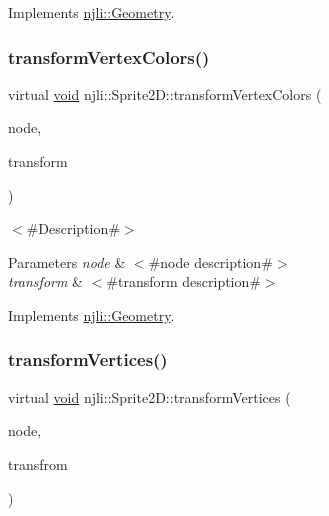 Implements \mbox{\hyperlink{classnjli_1_1_geometry_a8ffb29f40c6f175f83cc36568feb87c4}{njli\+::\+Geometry}}.

\mbox{\label{classnjli_1_1_sprite2_d_a9faa5df865ca871af37dea98682a52a2}} 
\subsubsection{\texorpdfstring{transform\+Vertex\+Colors()}{transformVertexColors()}}
{\footnotesize\ttfamily virtual \mbox{\hyperlink{_thread_8h_af1e856da2e658414cb2456cb6f7ebc66}{void}} njli\+::\+Sprite2\+D\+::transform\+Vertex\+Colors (\begin{DoxyParamCaption}\item[{\mbox{\hyperlink{classnjli_1_1_node}{Node}} $\ast$}]{node,  }\item[{const bt\+Transform \&}]{transform }\end{DoxyParamCaption})\hspace{0.3cm}{\ttfamily [virtual]}}

$<$\#\+Description\#$>$


\begin{DoxyParams}{Parameters}
{\em node} & $<$\#node description\#$>$ \\
\hline
{\em transform} & $<$\#transform description\#$>$ \\
\hline
\end{DoxyParams}


Implements \mbox{\hyperlink{classnjli_1_1_geometry_a1169257a4241392cec0a23c922f148f3}{njli\+::\+Geometry}}.

\mbox{\label{classnjli_1_1_sprite2_d_a357c517b9064bf729722e3cff9312dd0}} 
\subsubsection{\texorpdfstring{transform\+Vertices()}{transformVertices()}}
{\footnotesize\ttfamily virtual \mbox{\hyperlink{_thread_8h_af1e856da2e658414cb2456cb6f7ebc66}{void}} njli\+::\+Sprite2\+D\+::transform\+Vertices (\begin{DoxyParamCaption}\item[{\mbox{\hyperlink{classnjli_1_1_node}{Node}} $\ast$}]{node,  }\item[{const bt\+Transform \&}]{transfrom }\end{DoxyParamCaption})\hspace{0.3cm}{\ttfamily [virtual]}}

